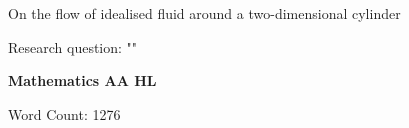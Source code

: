 \begin{titlepage}
	\begin{center}
		\vspace*{2cm}
		\Large On the flow of idealised fluid around a two-dimensional cylinder

		\vspace{1.5cm}
		\normalsize Research question: "\textbf{\researchquestion}"

		\vspace{1.5cm}
		\large\textbf{Mathematics AA HL}

		\vfill
		\color{darkgray} Word Count: 1276
	\end{center}
\end{titlepage}

\tableofcontents\newpage